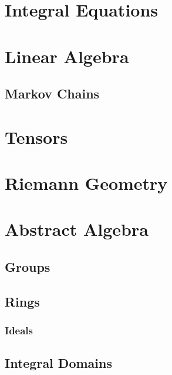 \documentclass[12pt, english]{book}
\begin{document}
	\part{Integral Equations} \label{Integral Equations Part}
	
	
	\part{Linear Algebra} \label{Linear Algebra Part}
	
	\chapter{Markov Chains} \label{Markov Chains Chapter - Linear Algebra}
	
	
	\part{Tensors} \label{Tensors Part}
	
	
	\part{Riemann Geometry} \label{Reimann Geometry Part}
	
	
	\part{Abstract Algebra} \label{Abstract Algebra Part}
	
	\chapter{Groups} \label{Groups Chapter - Abstract Algebra}
	
	
	\chapter{Rings} \label{Rings Chapter - Abstract Algebra}
	
	\section{Ideals} \label{Ideals Section - Abstract Algebra}
	
	\chapter{Integral Domains} \label{Integral Domains Chapter - Abstract Algebra}
	
\end{document}
